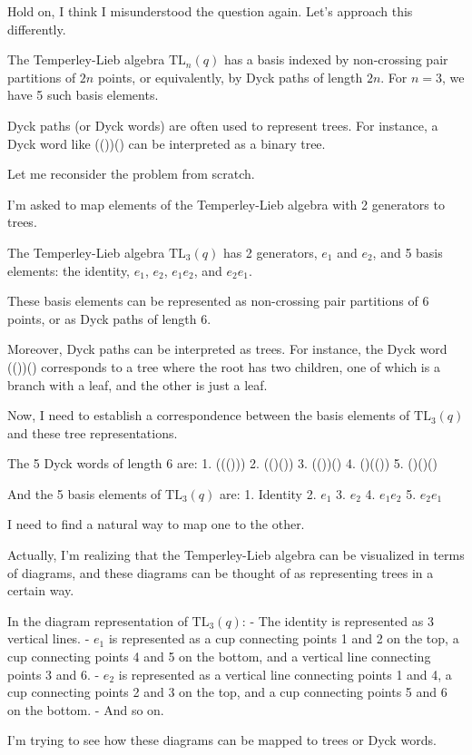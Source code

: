 \documentclass[12p]{article}
\newcounter{reasoningcounter}
\newenvironment{reasoning}[1][]
{\refstepcounter{reasoningcounter}%
\begin{tcolorbox}[
    title=Reasoning \thereasoningcounter: #1,
    colback=white, %
    colframe=gray,
    coltext=black, %
    fonttitle=\bfseries\normalsize,
    top=2mm,
    bottom=2mm,
    enlarge top initially by=5mm
]
\small
}
{\end{tcolorbox}}
\begin{document}
\begin{reasoning}
Hold on, I think I misunderstood the question again. Let's approach this differently.

The Temperley-Lieb algebra $\text{TL}_n(q)$ has a basis indexed by non-crossing pair partitions of $2n$ points, or equivalently, by Dyck paths of length $2n$. For $n=3$, we have 5 such basis elements.

Dyck paths (or Dyck words) are often used to represent trees. For instance, a Dyck word like (())() can be interpreted as a binary tree.

Let me reconsider the problem from scratch. 

I'm asked to map elements of the Temperley-Lieb algebra with 2 generators to trees.

The Temperley-Lieb algebra $\text{TL}_3(q)$ has 2 generators, $e_1$ and $e_2$, and 5 basis elements: the identity, $e_1$, $e_2$, $e_1 e_2$, and $e_2 e_1$.

These basis elements can be represented as non-crossing pair partitions of 6 points, or as Dyck paths of length 6.

Moreover, Dyck paths can be interpreted as trees. For instance, the Dyck word (())() corresponds to a tree where the root has two children, one of which is a branch with a leaf, and the other is just a leaf.

Now, I need to establish a correspondence between the basis elements of $\text{TL}_3(q)$ and these tree representations.

The 5 Dyck words of length 6 are:
1. ((()))
2. (()())
3. (())()
4. ()(())
5. ()()()

And the 5 basis elements of $\text{TL}_3(q)$ are:
1. Identity
2. $e_1$
3. $e_2$
4. $e_1 e_2$
5. $e_2 e_1$

I need to find a natural way to map one to the other.

Actually, I'm realizing that the Temperley-Lieb algebra can be visualized in terms of diagrams, and these diagrams can be thought of as representing trees in a certain way.

In the diagram representation of $\text{TL}_3(q)$:
- The identity is represented as 3 vertical lines.
- $e_1$ is represented as a cup connecting points 1 and 2 on the top, a cup connecting points 4 and 5 on the bottom, and a vertical line connecting points 3 and 6.
- $e_2$ is represented as a vertical line connecting points 1 and 4, a cup connecting points 2 and 3 on the top, and a cup connecting points 5 and 6 on the bottom.
- And so on.

I'm trying to see how these diagrams can be mapped to trees or Dyck words.


\end{reasoning}
\end{document}
